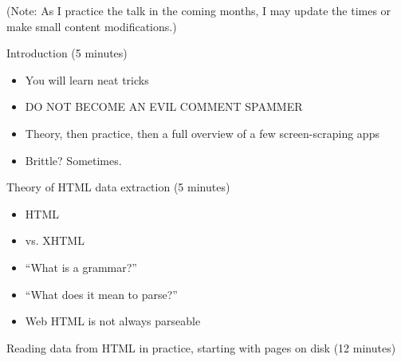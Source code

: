 \documentclass[10pt,a4paper,english]{article}
\begin{document}
(Note: As I practice the talk in the coming months, I may update the times or make small content modifications.)
\begin{list}{.}
{
\setlength{\rightmargin}{\leftmargin}
}
\item {} 
Introduction (5 minutes)

\end{list}
\begin{itemize}
\item {} 
You will learn neat tricks

\item {} 
DO NOT BECOME AN EVIL COMMENT SPAMMER

\item {} 
Theory, then practice, then a full overview of a few screen-scraping apps

\item {} 
Brittle?  Sometimes.

\end{itemize}
\setcounter{listcnt0}{0}
\begin{list}{.}
{
\addtocounter{listcnt0}{1}
\setlength{\rightmargin}{\leftmargin}
}
\item {} 
Theory of HTML data extraction (5 minutes)

\end{list}
\begin{itemize}
\item {} 
HTML

\item {} 
vs. XHTML

\item {} 
``What is a grammar?''

\item {} 
``What does it mean to parse?''

\item {} 
Web HTML is not always parseable

\end{itemize}
\setcounter{listcnt0}{0}
\begin{list}{.}
{
\addtocounter{listcnt0}{2}
\setlength{\rightmargin}{\leftmargin}
}
\item {} 
Reading data from HTML in practice, starting with pages on disk (12 minutes)

\end{list}
\end{document}
